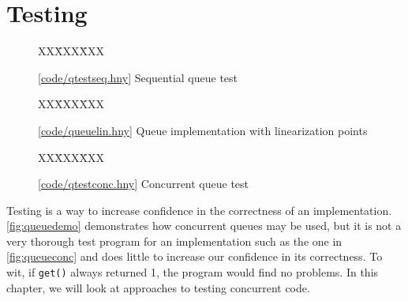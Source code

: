 \documentclass{report}
\newcommand{\harmonysource}[1]{
\begin{tabbing}
XX\=XXX\=XXX\kill
    
\end{tabbing}
}
\newcommand{\harmonylink}[1]{%
[\href{https://harmony.cs.cornell.edu/#1}{\underline{#1}}]%
}
\newenvironment{code}{
\tcolorbox
}{
\endtcolorbox
}
\begin{document}
\chapter{Testing}
\label{ch:testing}

\begin{figure}
\begin{code}
\harmonysource{qtestseq}
\end{code}
\caption{\harmonylink{code/qtestseq.hny} Sequential queue test}
\label{fig:qtestseq}
\end{figure}

\begin{figure}
\begin{code}
\harmonysource{queuelin}
\end{code}
\caption{\harmonylink{code/queuelin.hny} Queue implementation with linearization points}
\label{fig:queuelin}
\end{figure}

\begin{figure}
\begin{code}
\harmonysource{qtestconc}
\end{code}
\caption{\harmonylink{code/qtestconc.hny} Concurrent queue test}
\label{fig:qtestconc}
\end{figure}

Testing is a way to increase confidence in the correctness
of an implementation.
\autoref{fig:queuedemo} demonstrates how concurrent queues
may be used, but it is not a very thorough test program
for an implementation such as the one in \autoref{fig:queueconc}
and does little to increase our confidence in its correctness.
To wit, if \texttt{get()} always returned 1, the program
would find no problems.
In this chapter, we will look at approaches to testing
concurrent code.

\end{document}
